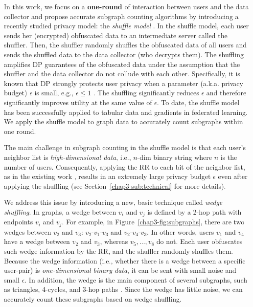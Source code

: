 In this work, we focus on a \textbf{one-round} of interaction between users and the data collector and propose accurate subgraph counting algorithms by introducing a recently studied privacy model: the \textit{shuffle model} \cite{Erlingsson_SODA19,Feldman_FOCS21}. 
In the shuffle model, each user sends her (encrypted) obfuscated data to an intermediate server called the shuffler. 
Then, the shuffler randomly shuffles the obfuscated data of all users and sends the shuffled data to the data collector (who decrypts them). 
The shuffling amplifies DP guarantees of the obfuscated data under the assumption that the shuffler and the data collector do not collude with each other. 
Specifically, it is known that DP strongly protects user privacy when a parameter (a.k.a. privacy budget) $\epsilon$ is small, e.g., $\epsilon \leq 1$ \cite{DP_Li}. 
The shuffling significantly reduces $\epsilon$ and therefore significantly improves utility at the same value of $\epsilon$. 
To date, the shuffle model has been successfully applied to tabular data \cite{Meehan_ICLR22,Wang_PVLDB20} and 
gradients \cite{Girgis_AISTATS21,Liu_AAAI21} in federated learning. 
We 
apply the shuffle model to graph data to accurately count subgraphs within one round. 

The main challenge in subgraph counting in the shuffle model is that each user's neighbor list is \textit{high-dimensional data}, i.e., $n$-dim binary string where $n$ is the number of users. 
Consequently, applying the RR to each bit of the neighbor list, as in the existing work \cite{Imola_USENIX21,Imola_USENIX22,Ye_ICDE20,Ye_TKDE21}, results in an extremely large privacy budget $\epsilon$ even after applying the shuffling (see Section~\ref{chap3-sub:technical} for more details). 

We address this issue by introducing a new, basic technique called \textit{wedge shuffling}. 
In graphs, a wedge between $v_i$ and $v_j$ is defined by a 2-hop path with endpoints $v_i$ and $v_j$. 
For example, in Figure~\ref{chap3-fig:subgraphs}, 
there are two wedges between $v_2$ and $v_3$: $v_2$-$v_1$-$v_3$ and $v_2$-$v_4$-$v_3$. 
In other words, users $v_1$ and $v_4$ have a wedge between $v_2$ and $v_3$, whereas $v_5, \ldots, v_8$ do not. 
Each user obfuscates such wedge information by the RR, and the shuffler randomly shuffles them. 
Because the wedge information (i.e., whether there is a wedge between a specific user-pair) 
is \textit{one-dimensional binary data}, it can be sent with small noise and small $\epsilon$. 
In addition, the wedge is the main component of several subgraphs, such as triangles, 4-cycles, and 3-hop paths \cite{Sun_CCS19}. 
Since the wedge has little noise, we can accurately count these subgraphs based on wedge shuffling. 

